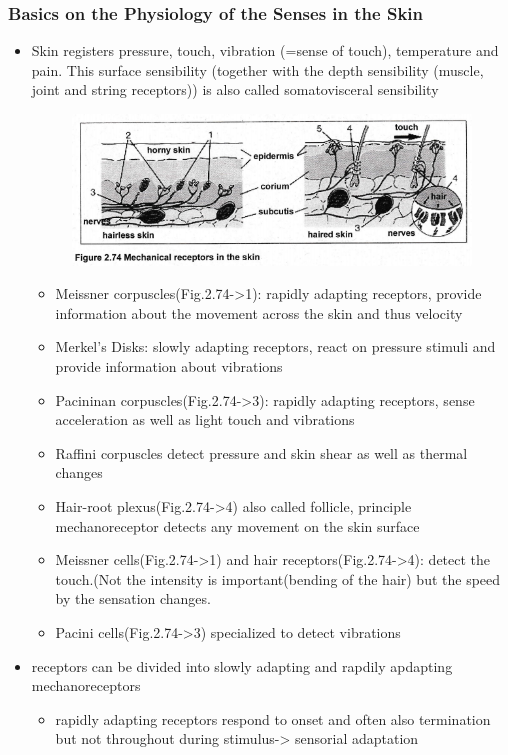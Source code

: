 \documentclass{standalone}
\begin{document}
\subsubsection*{Basics on the Physiology of the Senses in the Skin}
\begin{itemize}
	\item Skin registers pressure, touch, vibration (=sense of touch), temperature and pain. This surface sensibility (together with the depth sensibility (muscle, joint and string receptors)) is also called somatovisceral sensibility
	\begin{figure}[H]
			\centering
			\includegraphics[width = 0.7\linewidth]{Figures/2_74.png}
	\end{figure}
	\begin{itemize}
		\item Meissner corpuscles(Fig.2.74->1): rapidly adapting receptors, provide information about the movement across the skin and thus velocity
		\item Merkel's Disks: slowly adapting receptors, react on pressure stimuli and provide information about vibrations
		\item Pacininan corpuscles(Fig.2.74->3): rapidly adapting receptors, sense acceleration as well as light touch and vibrations
		\item Raffini corpuscles detect pressure and skin shear as well as thermal changes
		\item Hair-root plexus(Fig.2.74->4) also called follicle, principle mechanoreceptor detects any movement on the skin surface
		\item Meissner cells(Fig.2.74->1) and hair receptors(Fig.2.74->4): detect the touch.(Not the intensity is important(bending of the hair) but the speed by the sensation changes.
		\item Pacini cells(Fig.2.74->3) specialized to detect vibrations
	\end{itemize}
	\item receptors can be divided into slowly adapting and rapdily apdapting mechanoreceptors
	\begin{itemize}
		\item rapidly adapting receptors respond to onset and often also termination but not throughout during stimulus-> sensorial adaptation

\end{itemize}
\end{itemize}
\end{document}
